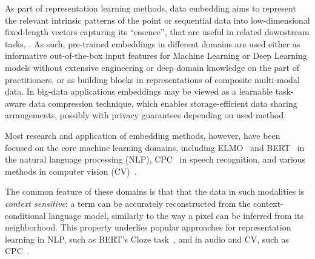 \documentclass[sigconf]{acmart}
\begin{document}


As part of representation learning methods, data embedding aims to represent the relevant
intrinsic patterns of the point or sequential data into low-dimensional fixed-length vectors
capturing its ``essence'', that are useful in related downstream tasks,%
\citep{Mikolov2013EfficientEO,Peters2018DeepCW,Devlin2019BERTPO,Dosovitskiy2014DiscriminativeUF,Oord2018RepresentationLW}.
As such, pre-trained embeddings in different domains are used either as informative
out-of-the-box input features for Machine Learning or Deep Learning models without extensive
engineering or deep domain knowledge on the part of practitioners, or as building blocks
in representations of composite multi-modal data. In big-data applications embeddings may
be viewed as a learnable task-aware data compression technique, which enables storage-efficient
data sharing arrangements, possibly with privacy guarantees depending on used method.

Most research and application of embedding methods, however, have been focused on the core
machine learning domains, including ELMO~\citep{Peters2018DeepCW} and BERT~\citep{Devlin2019BERTPO}
in the natural language processing (NLP), CPC~\citep{Oord2018RepresentationLW} in speech recognition,
and various methods in computer vision (CV)~\citep{Dosovitskiy2014DiscriminativeUF, Oord2018RepresentationLW}.

The common feature of these domains is that that the data in such modalities is \emph{context
sensitive}: a term can be accurately reconstructed from the context-conditional language
model, similarly to the way a pixel can be inferred from its neighborhood. This property
underlies popular approaches for representation learning in NLP, such as BERT's Cloze
task~\citep{Devlin2019BERTPO}, and in audio and CV, such as CPC~\citep{Oord2018RepresentationLW}.
\end{document}
